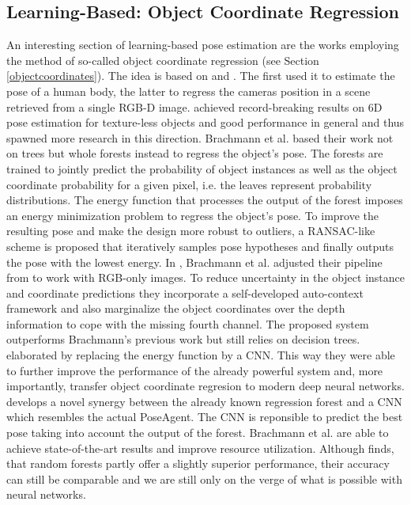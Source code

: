 \subsection{Learning-Based: Object Coordinate Regression}

An interesting section of learning-based pose estimation are the works employing the method of so-called object coordinate regression (see Section \ref{objectcoordinates}). The idea is based on \cite{tsharp} and \cite{firstcoordinateregression}. The first used it to estimate the pose of a human body, the latter to regress the cameras position in a scene retrieved from a single RGB-D image.
\nnewline
\cite{brachmann1} achieved record-breaking results on 6D pose estimation for texture-less objects and good performance in general and thus spawned more research in this direction. Brachmann et al. based their work not on trees but whole forests instead to regress the object's pose. The forests are trained to jointly predict the probability of object instances as well as the object coordinate probability for a given pixel, i.e. the leaves represent probability distributions. The energy function that processes the output of the forest imposes an energy minimization problem to regress the object's pose. To improve the resulting pose and make the design more robust to outliers, a RANSAC-like scheme is proposed that iteratively samples pose hypotheses and finally outputs the pose with the lowest energy.
\nnewline
In \cite{brachmann2}, Brachmann et al. adjusted their pipeline from \cite{brachmann1} to work with RGB-only images. To reduce uncertainty in the object instance and coordinate predictions they incorporate a self-developed auto-context framework and also marginalize the object coordinates over the depth information to cope with the missing fourth channel. The proposed system outperforms Brachmann's previous work but still relies on decision trees. 
\nnewline
\cite{akrull} elaborated \cite{brachmann1} by replacing the energy function by a CNN. This way they were able to further improve the performance of the already powerful system and, more importantly, transfer object coordinate regresion to modern deep neural networks. \cite{poseagent} develops a novel synergy between the already known regression forest and a CNN which resembles the actual PoseAgent. The CNN is reponsible to predict the best pose taking into account the output of the forest. Brachmann et al. are able to achieve state-of-the-art results and improve resource utilization. Although \cite{trees-vs-cnn} finds, that random forests partly offer a slightly superior performance, their accuracy can still be comparable and we are still only on the verge of what is possible with neural networks.

